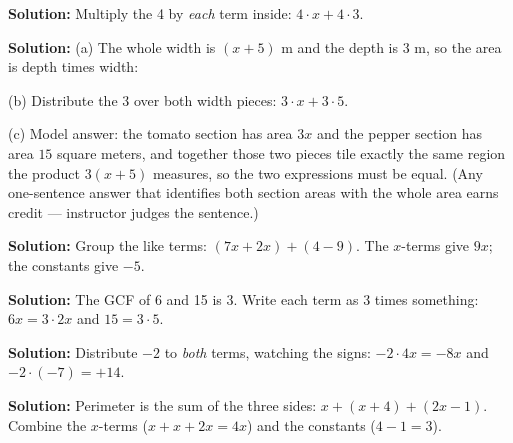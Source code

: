 \documentclass[12pt]{article}
\begin{document}



\textbf{Solution:} Multiply the 4 by \emph{each} term inside:
$4 \cdot x + 4 \cdot 3$. 


\textbf{Solution:} (a) The whole width is $(x + 5)$ m and the depth is 3 m, so the
area is depth times width: 

(b) Distribute the 3 over both width pieces: $3 \cdot x + 3 \cdot 5$. 

(c) Model answer: the tomato section has area $3x$ and the pepper section has area
$15$ square meters, and together those two pieces tile exactly the same region the
product $3(x + 5)$ measures, so the two expressions must be equal. (Any one-sentence
answer that identifies both section areas with the whole area earns credit ---
instructor judges the sentence.)


\textbf{Solution:} Group the like terms: $(7x + 2x) + (4 - 9)$. The $x$-terms give
$9x$; the constants give $-5$. 


\textbf{Solution:} The GCF of 6 and 15 is 3. Write each term as 3 times something:
$6x = 3 \cdot 2x$ and $15 = 3 \cdot 5$. 


\textbf{Solution:} Distribute $-2$ to \emph{both} terms, watching the signs:
$-2 \cdot 4x = -8x$ and $-2 \cdot (-7) = +14$. 


\textbf{Solution:} Perimeter is the sum of the three sides:
$x + (x + 4) + (2x - 1)$. Combine the $x$-terms ($x + x + 2x = 4x$) and the constants
($4 - 1 = 3$). 

\end{document}
